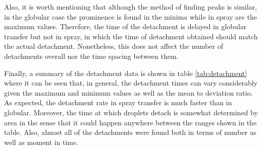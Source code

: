 Also, it is worth mentioning that although the method of finding peaks is similar, in the globular case the prominence is found in the minima while in spray are the maximum values. Therefore, the time of the detachment is delayed in globular transfer but not in spray, in which the time of detachment obtained should match the actual detachment. Nonetheless, this does not affect the number of detachments overall nor the time spacing between them.

Finally, a summary of the detachment data is shown in table \ref{tab:detachment} where it can be seen that, in general, the detachment times can vary considerably given the maximum and minimum values as well as the mean to deviation ratio. As expected, the detachment rate in spray transfer is much faster than in globular. Moreover, the time at which droplets detach is somewhat determined by area in the sense that it could happen anywhere between the ranges shown in the table.  Also, almost all of the detachments were found both in terms of number as well as moment in time.

